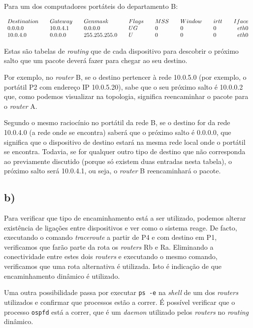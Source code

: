 \documentclass{llncs}
\begin{document}
Para um dos computadores portáteis do departamento B:

\[
\begin{array}{l l l l l l l l l l l l l l r }
Destination &&  Gateway    &&   Genmask       &&Flags &&MSS&& Window&&irtt&&Iface\\
0.0.0.0     &&  10.0.4.1   &&   0.0.0.0       &&UG    &&  0&& 0     &&   0&&eth0\\
10.0.4.0    &&  0.0.0.0    &&   255.255.255.0 &&U     &&  0&& 0     &&   0&&eth0
\end{array}
\]

Estas são tabelas de \textit{routing} que de cada dispositivo para descobrir o próximo salto que um pacote deverá fazer para chegar ao seu destino.

Por exemplo, no \textit{router} B, se o destino pertencer à rede 10.0.5.0 (por exemplo, o portátil P2 com endereço IP 10.0.5.20), sabe que o seu próximo salto é 10.0.0.2 que, como podemos visualizar na topologia, significa reencaminhar o pacote para o \textit{router} A.

Segundo o mesmo raciocínio no portátil da rede B, se o destino for da rede 10.0.4.0 (a rede onde se encontra) saberá que o próximo salto é 0.0.0.0, que significa que o dispositivo de destino estará na mesma rede local onde o portátil se encontra. Todavia, se for qualquer outro tipo de destino que não corresponda ao previamente discutido (porque só existem duas entradas nesta tabela), o próximo salto será 10.0.4.1, ou seja, o \textit{router} B reencaminhará o pacote.

\subsection*{b)}

Para verificar que tipo de encaminhamento está a ser utilizado, podemos alterar existência de ligações entre dispositivos e ver como o sistema reage. De facto, executando o comando \textit{traceroute} a partir de P4 e com destino em P1, verificamos que farão parte da rota os \textit{routers} Rb e Ra. Eliminando a conectividade entre estes dois \textit{routers} e executando o mesmo comando, verificamos que uma rota alternativa é utilizada. Isto é indicação de que encaminhamento dinâmico é utilizado. 

Uma outra possibilidade passa por executar \texttt{ps -e} na \textit{shell} de um dos \textit{routers} utilizados e confirmar que processos estão a correr. É possível verificar que o processo \texttt{ospfd} está a correr, que é um \textit{daemon} utilizado pelos \textit{routers} no \textit{routing} dinâmico.
\end{document}
